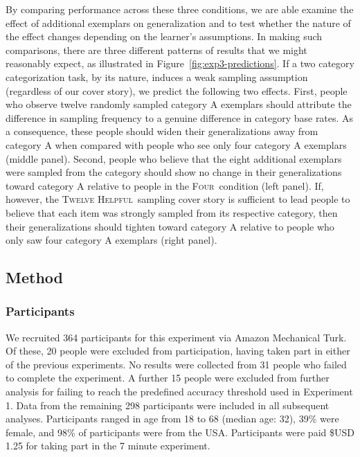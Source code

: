 \documentclass[doc,apacite]{apa6}
\newcommand{\four}{\textsc{Four}}
\newcommand{\helpful}{\textsc{Twelve Helpful}}
\begin{document}
By comparing performance across these three conditions, we are able examine the effect of additional exemplars on generalization and to test whether the nature of the effect changes depending on the learner's assumptions. In making such comparisons, there are three different patterns of results that we might reasonably expect, as illustrated in Figure~\ref{fig:exp3-predictions}. If a two category categorization task, by its nature, induces a weak sampling assumption (regardless of our cover story), we predict the following two effects.  First, people who observe twelve randomly sampled category A exemplars should attribute the difference in sampling frequency to a genuine difference in category base rates. As a consequence, these people should widen their generalizations away from category A when compared with people who see only four category A exemplars (middle panel).  Second, people who believe that the eight additional exemplars were sampled from the category should show no change in their generalizations toward category A relative to people in the \four\ condition (left panel).  If, however, the \helpful\ sampling cover story is sufficient to lead people to believe that each item was strongly sampled from its respective category, then their generalizations should tighten toward category A relative to people who only saw four category A exemplars (right panel).

\subsection{Method}

\subsubsection{Participants}

We recruited 364 participants for this experiment via Amazon Mechanical Turk. Of
these, 20 people were excluded from participation, having taken part in either
of the previous experiments. No results were collected from 31 people who failed
to complete the experiment. A further 15 people were excluded from further
analysis for failing to reach the predefined accuracy threshold used in Experiment 1. Data from the remaining 298 participants were included in all subsequent analyses. Participants ranged in age from 18 to 68 (median age: 32), 39\% were female, and 98\% of participants were from the USA. Participants were paid \$USD 1.25 for taking part in the 7 minute experiment.
\end{document}
